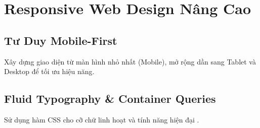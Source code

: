 \chapter{Responsive Web Design Nâng Cao}
\label{chap:responsive_design}

\section{Tư Duy Mobile-First}
Xây dựng giao diện từ màn hình nhỏ nhất (Mobile), mở rộng dần sang Tablet và Desktop để tối ưu hiệu năng.

\section{Fluid Typography \& Container Queries}
Sử dụng hàm CSS  cho cỡ chữ linh hoạt và tính năng hiện đại .
